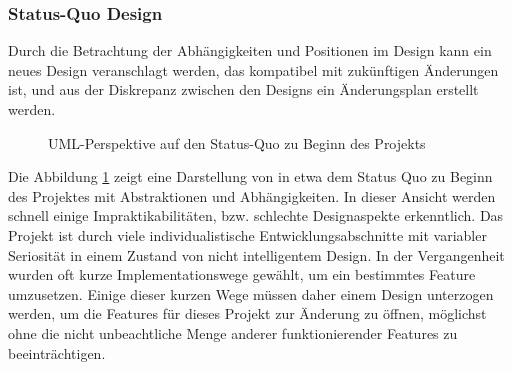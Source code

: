 \subsubsection{Status-Quo Design}
Durch die Betrachtung der Abhängigkeiten und Positionen im Design kann ein neues Design veranschlagt werden, das kompatibel mit zukünftigen Änderungen ist, und aus der Diskrepanz zwischen den Designs ein Änderungsplan erstellt werden.\\

\begin{figure}

\centering
{}
\caption{UML-Perspektive auf den Status-Quo zu Beginn des Projekts}
\label{fig:status_quo}
\end{figure}

Die Abbildung \ref{fig:status_quo} zeigt eine Darstellung von in etwa dem Status Quo zu Beginn des Projektes mit Abstraktionen und Abhängigkeiten.
In dieser Ansicht werden schnell einige Impraktikabilitäten, bzw. schlechte Designaspekte erkenntlich.
Das Projekt ist durch viele individualistische Entwicklungsabschnitte mit variabler Seriosität in einem Zustand von nicht intelligentem Design. 
In der Vergangenheit wurden oft kurze Implementationswege gewählt, um ein bestimmtes Feature umzusetzen. Einige dieser kurzen Wege müssen daher einem Design unterzogen werden, um die Features für dieses Projekt zur Änderung zu öffnen, möglichst ohne die nicht unbeachtliche Menge anderer funktionierender Features zu beeinträchtigen.\\

